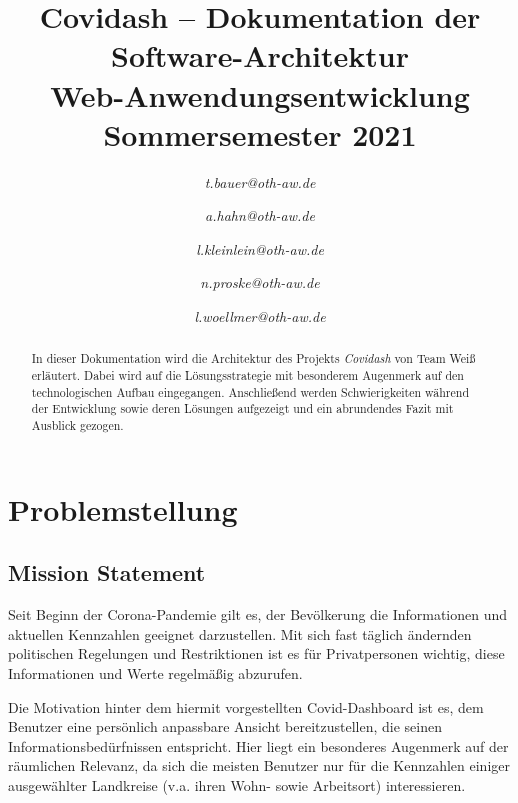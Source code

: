 \documentclass[conference]{IEEEtran}
\begin{document}
\title{Covidash -- Dokumentation der Software-Architektur\\
{\footnotesize Web-Anwendungsentwicklung Sommersemester 2021}}
\author{
\textit{t.bauer@oth-aw.de}
\and
{}
\textit{a.hahn@oth-aw.de}
\and
{}
\textit{l.kleinlein@oth-aw.de}
\and
{}
\textit{n.proske@oth-aw.de}
\and
{}
\textit{l.woellmer@oth-aw.de}
}

\maketitle

\begin{abstract}
    In dieser Dokumentation wird die Architektur des Projekts \textit{Covidash} von Team Weiß erläutert.
    Dabei wird auf die Lösungsstrategie mit besonderem Augenmerk auf den technologischen Aufbau eingegangen.
    Anschließend werden Schwierigkeiten während der Entwicklung sowie deren Lösungen aufgezeigt und ein abrundendes Fazit mit Ausblick gezogen.
\end{abstract}





\section{Problemstellung}



\subsection{Mission Statement}

Seit Beginn der Corona-Pandemie gilt es, der Bevölkerung die Informationen und aktuellen Kennzahlen geeignet darzustellen. Mit sich fast täglich ändernden politischen Regelungen und Restriktionen ist es für Privatpersonen wichtig, diese Informationen und Werte regelmäßig abzurufen.

Die Motivation hinter dem hiermit vorgestellten Covid-Dashboard ist es, dem Benutzer eine persönlich anpassbare Ansicht bereitzustellen, die seinen Informationsbedürfnissen entspricht. Hier liegt ein besonderes Augenmerk auf der räumlichen Relevanz, da sich die meisten Benutzer nur für die Kennzahlen einiger ausgewählter Landkreise (v.a. ihren Wohn- sowie Arbeitsort) interessieren.
\end{document}
